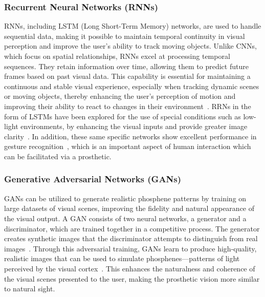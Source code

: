 \documentclass[twocolumn,10pt]{article}
\begin{document}
\subsubsection*{Recurrent Neural Networks (RNNs)}
RNNs, including LSTM (Long Short-Term Memory) networks, are used to handle
sequential data, making it possible to maintain temporal continuity in visual
perception and improve the user's ability to track moving objects. Unlike CNNs,
which focus on spatial relationships, RNNs excel at processing temporal
sequences. They retain information over time, allowing them to predict future
frames based on past visual data. This capability is essential for maintaining a
continuous and stable visual experience, especially when tracking dynamic scenes
or moving objects, thereby enhancing the user's perception of motion and
improving their ability to react to changes in their
environment~\parencite{nayebiRecurrentConnectionsPrimate2022,
      liaoBridgingGapsResidual2016}. RRNs in the form of LSTMs have been explored for
the use of special conditions such as low-light environments, by enhancing the
visual inputs and provide greater image
clarity~\parencite{renLowLightImageEnhancement2019}. In addition, these same
specific networks show excellent performance in gesture recognition~\parencite{nguyen-trongGestureRecognitionUsing2021}, which is an
important aspect of human interaction which can be facilitated via a prosthetic.

\subsubsection*{Generative Adversarial Networks (GANs)}
GANs can be utilized to generate realistic phosphene patterns by training on
large datasets of visual scenes, improving the fidelity and natural appearance
of the visual output. A GAN consists of two neural networks, a generator and a
discriminator, which are trained together in a competitive process. The
generator creates synthetic images that the discriminator attempts to
distinguish from real images~\parencite{ledigPhotoRealisticSingleImage2017}.
Through this adversarial training, GANs learn to produce high-quality, realistic
images that can be used to simulate phosphenes—patterns of light perceived by
the visual
cortex~\parencite{goodfellowGenerativeAdversarialNetworks2020,elnabawyPVGANGenerativeAdversarial2022}.
This enhances the naturalness and coherence of the visual scenes presented to
the user, making the prosthetic vision more similar to natural sight.
\end{document}
